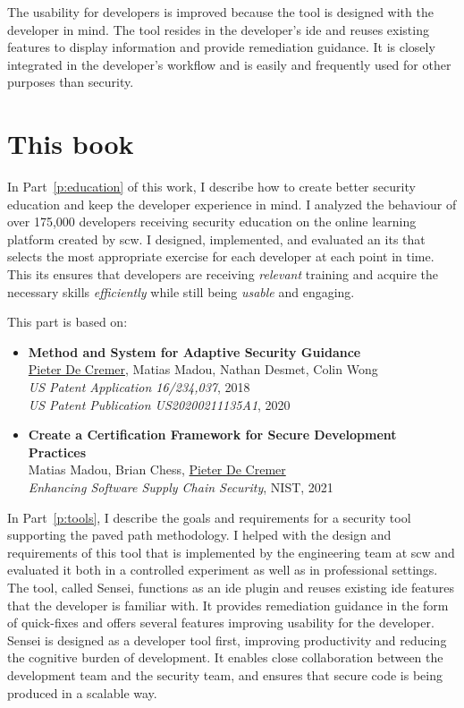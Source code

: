 The usability for developers is improved because the tool is designed with the developer in mind.  
The tool resides in the developer's \gls{ide} and reuses existing features to display information and provide remediation guidance.
It is closely integrated in the developer's workflow and is easily and frequently used for other purposes than security.

\section{This book}

In Part~\ref{p:education} of this work, I describe how to create better security education and keep the developer experience in mind.
I analyzed the behaviour of over 175,000 developers receiving security education on the online learning platform created by \gls{scw}. 
I designed, implemented, and evaluated an \gls{its} that selects the most appropriate exercise for each developer at each point in time.
This \gls{its} ensures that developers are receiving \textit{relevant} training and acquire the necessary skills \textit{efficiently} while still being \textit{usable} and engaging.

This part is based on:

\begin{itemize}
    \item 
    \textbf{Method and System for Adaptive Security Guidance}\\
    \underline{Pieter De Cremer}, Matias Madou, Nathan Desmet, Colin Wong\\
    \emph{US Patent Application 16/234,037}, 2018\\
    \emph{US Patent Publication US20200211135A1}, 2020
    \item 
    \textbf{Create a Certification Framework for Secure Development Practices}\\
    Matias Madou, Brian Chess, \underline{Pieter De Cremer}\\
    \emph{Enhancing Software Supply Chain Security}, NIST, 2021
\end{itemize}

In Part~\ref{p:tools}, I describe the goals and requirements for a security tool supporting the paved path methodology.
I helped with the design and requirements of this tool that is implemented by the engineering team at \gls{scw} and evaluated it both in a controlled experiment as well as in professional settings.
The tool, called Sensei, functions as an \gls{ide} plugin and reuses existing \gls{ide} features that the developer is familiar with.
It provides remediation guidance in the form of quick-fixes and offers several features improving usability for the developer.
Sensei is designed as a developer tool first, improving productivity and reducing the cognitive burden of development.
It enables close collaboration between the development team and the security team, and ensures that secure code is being produced in a scalable way.

